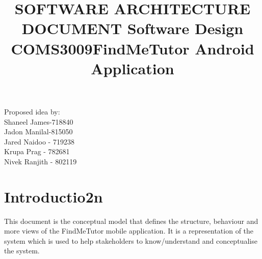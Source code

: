 \documentclass[12pt]{article}
\begin{document}
\title{\textbf{SOFTWARE ARCHITECTURE DOCUMENT }}
\maketitle

\begin{center}
\title{\textbf{Software Design COMS3009}}
\maketitle 
\end{center}
\begin{center}
\title{\textbf{FindMeTutor Android Application}}
\maketitle 
\end{center}

\begin{center}
Proposed idea by:\\
Shaneel James-718840
\\Jadon Manilal-815050
\\Jared Naidoo - 719238
\\Krupa Prag - 782681
\\Nivek Ranjith - 802119
\end{center}


\newpage
\tableofcontents
\newpage


\section{\textbf{Introductio2n}}
This document is the conceptual model that defines the structure, behaviour and more views of the FindMeTutor mobile application. It is a representation of the system which is used to help stakeholders to know/understand and conceptualise the system.

\end{document}
